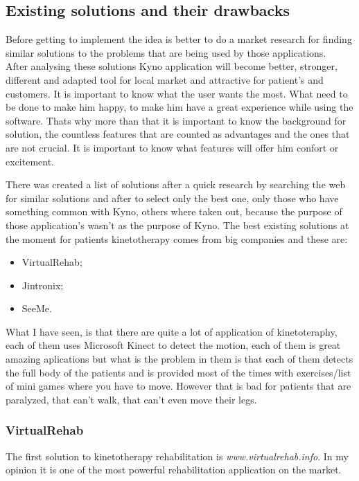 \subsection{Existing solutions and their drawbacks}
Before getting to implement the idea is better to do a market research for finding similar solutions to the problems that are being used by those applications.
\\
After analysing these solutions Kyno application will become better, stronger, different and adapted tool for local market and attractive for patient's and customers.
It is important to know what the user wants the most. What need to be done to make him happy, to make him have a great experience while using the software. Thats why more than that it is important to know the background for solution, the countless features that are counted as advantages and the ones that are not crucial. It is important to know what features will offer him confort or excitement. 

There was created a list of solutions after a quick research by searching the web for similar solutions and after to select only the best one, only those who have something common with Kyno, others where taken out, because the purpose of those application's wasn't as the purpose  of Kyno. The best existing solutions at the moment for patients kinetotherapy comes from big companies and these are: 

\begin{itemize}
\item VirtualRehab;
\item Jintronix;
\item SeeMe.
\end{itemize}

What I have seen, is that there are quite a lot of application of kinetoteraphy, each of them uses Microsoft Kinect to detect the motion, each of them is great amazing aplications but what is the problem in them is that each of them detects the full body of the patients and is provided most of the times with exercises/list of mini games where you have to move. However that is bad for patients that are paralyzed, that can't walk, that can't even move their legs.


\subsubsection{VirtualRehab}
The first solution to kinetotherapy rehabilitation is \textit{www.virtualrehab.info}. In my opinion it is one of the most powerful rehabilitation application on the market. 

